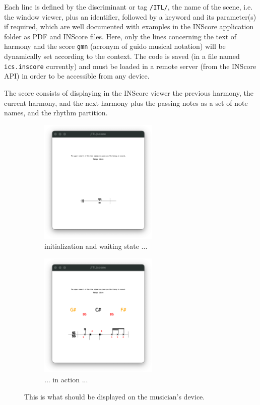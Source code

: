 \documentclass{article}
\begin{document}
\noindent  Each line is defined by the discriminant or tag \texttt{/ITL/}, the name of the scene, i.e. the window viewer, plus an identifier, followed by a keyword and its parameter(s) if required, which are well documented with examples in the INScore application folder as PDF and INScore files. Here, only the lines concerning the text of harmony and the score \texttt{gmn} (acronym of guido musical notation) will be dynamically set according to the context. The code is saved (in a file named \texttt{ics.inscore} currently) and must be loaded in a remote server (from the INScore API) in order to be accessible from any device.

\bigskip

\noindent %
The score consists of displaying in the INScore viewer the previous harmony, the current harmony, and the next harmony plus the passing notes as a set of note names, and the rhythm partition.

 


\begin{figure}[h]

\begin{subfigure}{0.5\textwidth}
\includegraphics[width=0.9\linewidth, height=6cm]{init} 
\caption{initialization and waiting state ...}
\label{fig:init}
\end{subfigure}
\begin{subfigure}{0.5\textwidth}
\includegraphics[width=0.9\linewidth, height=6cm]{ins1}
\caption{... in action ...}
\label{fig:ins1}
\end{subfigure}

\caption{This is what should be displayed on the musician's device.}
\label{fig:insviewer}
\end{figure}
\end{document}
